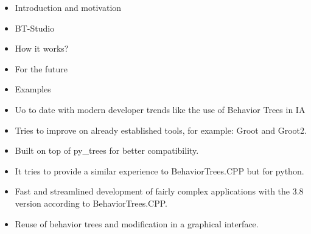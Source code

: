 \documentclass[notes,slidesec,a4]{seminar}
\title{\color{red}{BT Studio: a ROS Behaviour-Tree web IDE}}
\author{Asociación de Robótica e Inteligencia Artificial JdeRobot}
\date{josemaria.plaza@gmail.com, oscar.robotics@tutanota.com, javizqh@gmail.com}
\begin{document}
\maketitle


\begin{hslide}
    \begin{itemize}
\item Introduction and motivation
\item BT-Studio
\item How it works?
\item For the future
\item Examples
\end{itemize}
\end{hslide}

\begin{hslide}

\newpage
{}
\begin{itemize}
\item Uo to date with modern developer trends like the use of Behavior Trees in IA
\item Tries to improve on already established tools, for example: Groot and Groot2.
\item Built on top of py\_trees for better compatibility.
\item It tries to provide a similar experience to BehaviorTrees.CPP but for python.
\item Fast and streamlined development of fairly complex applications with the 3.8 version according to BehaviorTrees.CPP.
\item Reuse of behavior trees and modification in a graphical interface.
\end{itemize}
\end{hslide}
\end{document}
